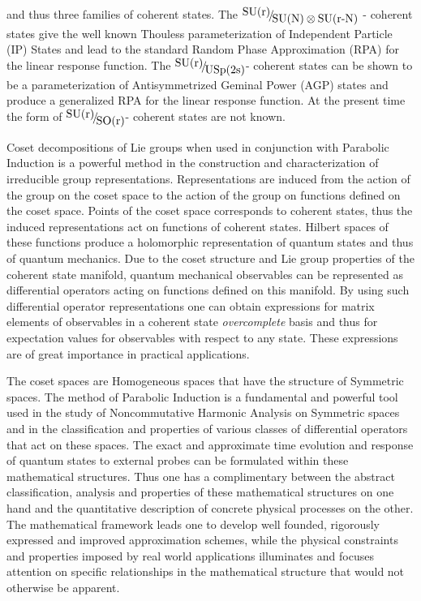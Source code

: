 \documentclass{amsart}
\begin{document}
and thus three families of coherent states. The
$\raise0.7ex\hbox{${\mbox{SU(r)}}$} \!\mathord{\left/ {\vphantom
{{\mbox{SU(r)}} {\mbox{SU(N)}\otimes
\mbox{SU(r-N)}}}}\right.\kern-\nulldelimiterspace}\!\lower0.7ex\hbox{${\mbox{SU(N)}\otimes
\mbox{SU(r-N)}}$}\mbox{ }$- coherent states give the well known Thouless
parameterization of Independent Particle (IP) States and lead to the
standard Random Phase Approximation (RPA) for the linear response function.
The $\raise0.7ex\hbox{${\mbox{SU(r)}}$} \!\mathord{\left/ {\vphantom
{{\mbox{SU(r)}}
{\mbox{USp(2s)}}}}\right.\kern-\nulldelimiterspace}\!\lower0.7ex\hbox{${\mbox{USp(2s)}}$}$-
coherent states can be shown to be a parameterization of Antisymmetrized
Geminal Power (AGP) states and produce a generalized RPA for the linear
response function. At the present time the form of
$\raise0.7ex\hbox{${\mbox{SU(r)}}$} \!\mathord{\left/ {\vphantom
{{\mbox{SU(r)}}
{\mbox{SO(r)}}}}\right.\kern-\nulldelimiterspace}\!\lower0.7ex\hbox{${\mbox{SO(r)}}$}$-
coherent states are not known.

Coset decompositions of Lie groups when used in conjunction with Parabolic
Induction is a powerful method in the construction and characterization of
irreducible group representations. Representations are induced from the
action of the group on the coset space to the action of the group on
functions defined on the coset space. Points of the coset space corresponds
to coherent states, thus the induced representations act on functions of
coherent states. Hilbert spaces of these functions produce a holomorphic
representation of quantum states and thus of quantum mechanics. Due to the
coset structure and Lie group properties of the coherent state manifold,
quantum mechanical observables can be represented as differential operators
acting on functions defined on this manifold. By using such differential
operator representations one can obtain expressions for matrix elements of
observables in a coherent state \textit{overcomplete }basis and thus for expectation values for
observables with respect to any state. These expressions are of great
importance in practical applications.

The coset spaces are Homogeneous spaces that have the structure of Symmetric
spaces. The method of Parabolic Induction is a fundamental and powerful tool
used in the study of Noncommutative Harmonic Analysis on Symmetric spaces
and in the classification and properties of various classes of differential
operators that act on these spaces. The exact and approximate time evolution
and response of quantum states to external probes can be formulated within
these mathematical structures. Thus one has a complimentary between the
abstract classification, analysis and properties of these mathematical
structures on one hand and the quantitative description of concrete physical
processes on the other. The mathematical framework leads one to develop well
founded, rigorously expressed and improved approximation schemes, while the
physical constraints and properties imposed by real world applications
illuminates and focuses attention on specific relationships in the
mathematical structure that would not otherwise be apparent.
\end{document}
